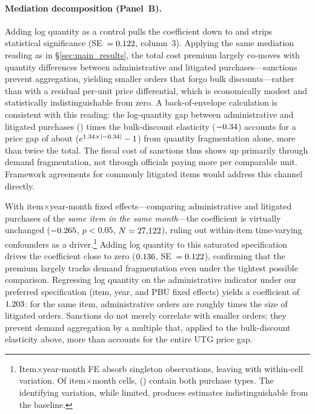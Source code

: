 \paragraph{Mediation decomposition (Panel~B).}
Adding log quantity as a control pulls the coefficient down to \BPutgPanelBcoef{} and strips statistical significance (SE~$= 0.122$, column~3). Applying the same mediation reading as in \S\ref{sec:main_results}, the \BPutgPctRange{} total cost premium largely co-moves with quantity differences between administrative and litigated purchases---sanctions prevent aggregation, yielding smaller orders that forgo bulk discounts---rather than with a residual per-unit price differential, which is economically modest and statistically indistinguishable from zero. A back-of-envelope calculation is consistent with this reading: the log-quantity gap between administrative and litigated purchases (\BPqtyGapAdmLit) times the bulk-discount elasticity ($-0.34$) accounts for a price gap of about \BPqtyImpliedPct{} ($e^{1.34 \times |-0.34|} - 1$) from quantity fragmentation alone, more than twice the \BPutgPct{} total. The fiscal cost of sanctions thus shows up primarily through demand fragmentation, not through officials paying more per comparable unit. Framework agreements for commonly litigated items would address this channel directly.

With item$\times$year-month fixed effects---comparing administrative and litigated purchases of the \emph{same item in the same month}---the coefficient is virtually unchanged ($-0.265$, $p < 0.05$, $N = 27{,}122$), ruling out within-item time-varying confounders as a driver.\footnote{Item$\times$year-month FE absorb \BPutgSingletonsItemYM{} singleton observations, leaving \BPutgNobsItemYM{} with within-cell variation. Of \BPutgCellsItemYM{} item$\times$month cells, \BPutgCellsBoth{} (\BPutgCellsBothPct) contain both purchase types. The identifying variation, while limited, produces estimates indistinguishable from the baseline.} Adding log quantity to this saturated specification drives the coefficient close to zero ($0.136$, SE~$= 0.122$), confirming that the premium largely tracks demand fragmentation even under the tightest possible comparison. Regressing log quantity on the administrative indicator under our preferred specification (item, year, and PBU fixed effects) yields a coefficient of $1.203$: for the same item, administrative orders are roughly \BPutgQtyAdminFoldPref{} times the size of litigated orders. Sanctions do not merely correlate with smaller orders; they prevent demand aggregation by a multiple that, applied to the bulk-discount elasticity above, more than accounts for the entire UTG price gap.

